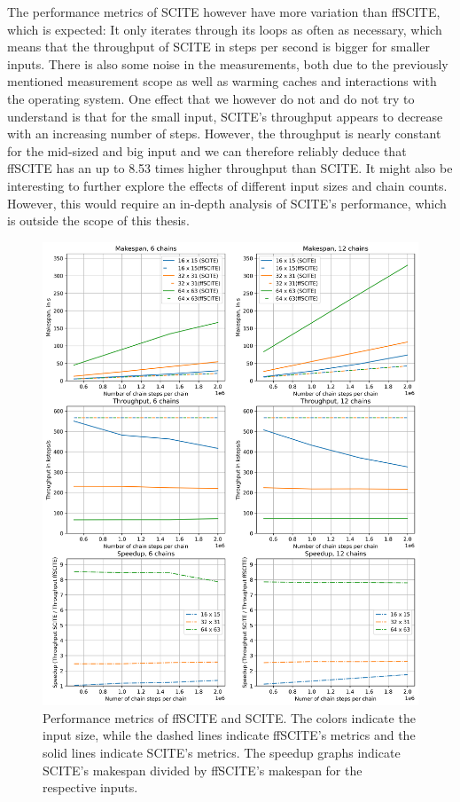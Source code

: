 The performance metrics of \ac{SCITE} however have more variation than \ac{ffSCITE}, which is expected: It only iterates through its loops as often as necessary, which means that the throughput of \ac{SCITE} in steps per second is bigger for smaller inputs. There is also some noise in the measurements, both due to the previously mentioned measurement scope as well as warming caches and interactions with the operating system. One effect that we however do not and do not try to understand is that for the small input, \ac{SCITE}'s throughput appears to decrease with an increasing number of steps. However, the throughput is nearly constant for the mid-sized and big input and we can therefore reliably deduce that \ac{ffSCITE} has an up to 8.53 times higher throughput than \ac{SCITE}. It might also be interesting to further explore the effects of different input sizes and chain counts. However, this would require an in-depth analysis of \ac{SCITE}'s performance, which is outside the scope of this thesis.

\begin{figure}
    \includegraphics[width=\textwidth]{figures/performance.png}
    \caption{Performance metrics of \ac{ffSCITE} and \ac{SCITE}. The colors indicate the input size, while the dashed lines indicate \ac{ffSCITE}'s metrics and the solid lines indicate \ac{SCITE}'s metrics. The speedup graphs indicate \ac{SCITE}'s makespan divided by \ac{ffSCITE}'s makespan for the respective inputs.}
    \label{fig:performance}
\end{figure}

